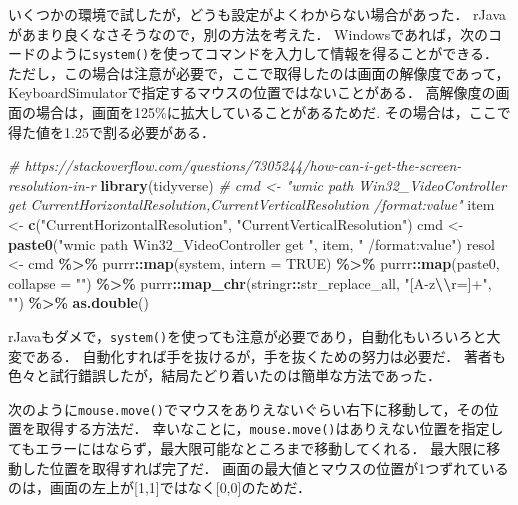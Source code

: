 \documentclass[
]{article}
\newenvironment{Shaded}{\begin{snugshade}}{\end{snugshade}}
\newcommand{\AttributeTok}[1]{\textcolor[rgb]{0.13,0.29,0.53}{#1}}
\newcommand{\CommentTok}[1]{\textcolor[rgb]{0.56,0.35,0.01}{\textit{#1}}}
\newcommand{\ConstantTok}[1]{\textcolor[rgb]{0.56,0.35,0.01}{#1}}
\newcommand{\FunctionTok}[1]{\textcolor[rgb]{0.13,0.29,0.53}{\textbf{#1}}}
\newcommand{\NormalTok}[1]{#1}
\newcommand{\OtherTok}[1]{\textcolor[rgb]{0.56,0.35,0.01}{#1}}
\newcommand{\SpecialCharTok}[1]{\textcolor[rgb]{0.81,0.36,0.00}{\textbf{#1}}}
\newcommand{\StringTok}[1]{\textcolor[rgb]{0.31,0.60,0.02}{#1}}
\begin{document}
いくつかの環境で試したが，どうも設定がよくわからない場合があった．
rJavaがあまり良くなさそうなので，別の方法を考えた．
Windowsであれば，次のコードのように\texttt{system()}を使ってコマンドを入力して情報を得ることができる．
ただし，この場合は注意が必要で，ここで取得したのは画面の解像度であって，KeyboardSimulatorで指定するマウスの位置ではないことがある．
高解像度の画面の場合は，画面を125\%に拡大していることがあるためだ.
その場合は，ここで得た値を1.25で割る必要がある．

\begin{Shaded}
\begin{Highlighting}[]
  \CommentTok{\#   https://stackoverflow.com/questions/7305244/how{-}can{-}i{-}get{-}the{-}screen{-}resolution{-}in{-}r}
\FunctionTok{library}\NormalTok{(tidyverse)}
  \CommentTok{\# cmd \textless{}{-} "wmic path Win32\_VideoController get CurrentHorizontalResolution,CurrentVerticalResolution /format:value"}
\NormalTok{item }\OtherTok{\textless{}{-}} \FunctionTok{c}\NormalTok{(}\StringTok{"CurrentHorizontalResolution"}\NormalTok{, }\StringTok{"CurrentVerticalResolution"}\NormalTok{)}
\NormalTok{cmd }\OtherTok{\textless{}{-}} \FunctionTok{paste0}\NormalTok{(}\StringTok{"wmic path Win32\_VideoController get "}\NormalTok{, item, }\StringTok{" /format:value"}\NormalTok{)}
\NormalTok{resol }\OtherTok{\textless{}{-}} 
\NormalTok{  cmd }\SpecialCharTok{\%\textgreater{}\%}
\NormalTok{  purrr}\SpecialCharTok{::}\FunctionTok{map}\NormalTok{(system, }\AttributeTok{intern =} \ConstantTok{TRUE}\NormalTok{) }\SpecialCharTok{\%\textgreater{}\%}
\NormalTok{  purrr}\SpecialCharTok{::}\FunctionTok{map}\NormalTok{(paste0, }\AttributeTok{collapse =} \StringTok{""}\NormalTok{) }\SpecialCharTok{\%\textgreater{}\%}
\NormalTok{  purrr}\SpecialCharTok{::}\FunctionTok{map\_chr}\NormalTok{(stringr}\SpecialCharTok{::}\NormalTok{str\_replace\_all, }\StringTok{"[A{-}z}\SpecialCharTok{\textbackslash{}\textbackslash{}}\StringTok{r=]+"}\NormalTok{, }\StringTok{""}\NormalTok{) }\SpecialCharTok{\%\textgreater{}\%}
  \FunctionTok{as.double}\NormalTok{()}
\end{Highlighting}
\end{Shaded}

rJavaもダメで，\texttt{system()}を使っても注意が必要であり，自動化もいろいろと大変である．
自動化すれば手を抜けるが，手を抜くための努力は必要だ．
著者も色々と試行錯誤したが，結局たどり着いたのは簡単な方法であった．

次のように\texttt{mouse.move()}でマウスをありえないぐらい右下に移動して，その位置を取得する方法だ．
幸いなことに，\texttt{mouse.move()}はありえない位置を指定してもエラーにはならず，最大限可能なところまで移動してくれる．
最大限に移動した位置を取得すれば完了だ．
画面の最大値とマウスの位置が1つずれているのは，画面の左上が{[}1,1{]}ではなく{[}0,0{]}のためだ．
\end{document}
